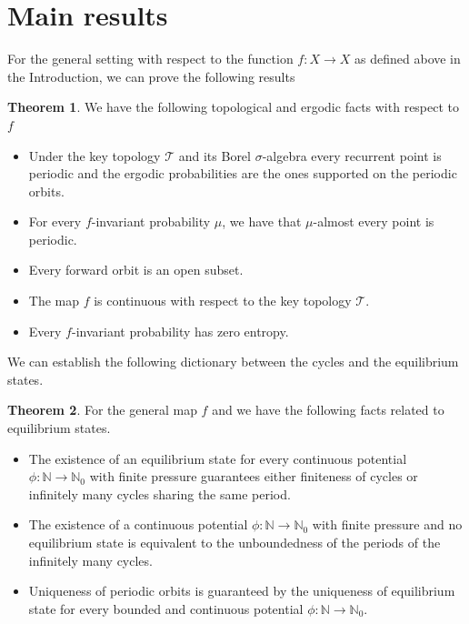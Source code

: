 \documentclass[12 pt]{amsart}
\theoremstyle{definition}
\newtheorem{theorema}{Theorem}
\begin{document}
	\section{Main results}
	For the general setting with respect to the function $f: X \to X$ as defined above in the Introduction, we can prove the following results
	
	\begin{theorema}\label{A}
		We have the following topological and ergodic facts with respect to $f$
		\begin{itemize}
			\item Under the key topology $\mathcal{T}$ and its Borel $\sigma$-algebra every recurrent point is periodic and the ergodic probabilities are the ones supported on the periodic orbits.
			
			\item For every $f$-invariant probability $\mu$, we have that $\mu$-almost every point is periodic.
					
			\item Every forward orbit is an open subset. 
			
			\item The map $f$ is continuous with respect to the key topology $\mathcal{T}$.
			
			\item Every $f$-invariant probability  has zero entropy.
		\end{itemize}
	\end{theorema}
	
	We can establish the following dictionary between the cycles and the equilibrium states.
	
	\begin{theorema}\label{B}
		For the general map $f$ and we have the following facts related to equilibrium states.
		\begin{itemize}		
			\item The existence of an equilibrium state for every continuous potential $\phi : \mathbb{N} \to \mathbb{N}_{0}$ with finite pressure guarantees either finiteness of cycles or infinitely many cycles sharing the same period.
			
			\item The existence of a continuous potential $\phi : \mathbb{N} \to \mathbb{N}_{0}$ with finite pressure and no equilibrium state is equivalent to the unboundedness of the periods of the infinitely many cycles.
			
			\item Uniqueness of periodic orbits is guaranteed by the uniqueness of equilibrium state for every bounded and continuous potential $\phi : \mathbb{N} \to \mathbb{N}_{0}$.
		\end{itemize}
	\end{theorema}
	
\end{document}
